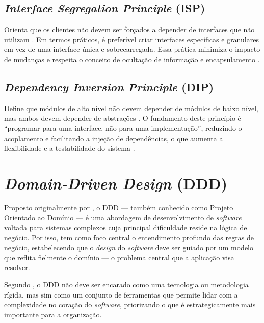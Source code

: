 \subsection{\textit{Interface Segregation Principle} (ISP)}

Orienta que os clientes não devem ser forçados a depender de interfaces que não utilizam \cite{martin2003}. Em termos práticos, é preferível criar interfaces específicas e granulares em vez de uma interface única e sobrecarregada. Essa prática minimiza o impacto de mudanças e respeita o conceito de ocultação de informação e encapsulamento \cite{booch2007}.

\subsection{\textit{Dependency Inversion Principle} (DIP)}

Define que módulos de alto nível não devem depender de módulos de baixo nível, mas ambos devem depender de abstrações \cite{martin2003}. O fundamento deste princípio é ``programar para uma interface, não para uma implementação'', reduzindo o acoplamento e facilitando a injeção de dependências, o que aumenta a flexibilidade e a testabilidade do sistema \cite{martin2008}.

\section{\textit{Domain-Driven Design} (DDD)}
\label{sec:ddd}

Proposto originalmente por , o DDD --- também conhecido como Projeto Orientado ao Domínio --- é uma abordagem de desenvolvimento de \textit{software} voltada para sistemas complexos cuja principal dificuldade reside na lógica de negócio. Por isso, tem como foco central o entendimento profundo das regras de negócio, estabelecendo que o \textit{design} do \textit{software} deve ser guiado por um modelo que reflita fielmente o domínio --- o problema central que a aplicação visa resolver.

Segundo , o DDD não deve ser encarado como uma tecnologia ou metodologia rígida, mas sim como um conjunto de ferramentas que permite lidar com a complexidade no coração do \textit{software}, priorizando o que é estrategicamente mais importante para a organização.


